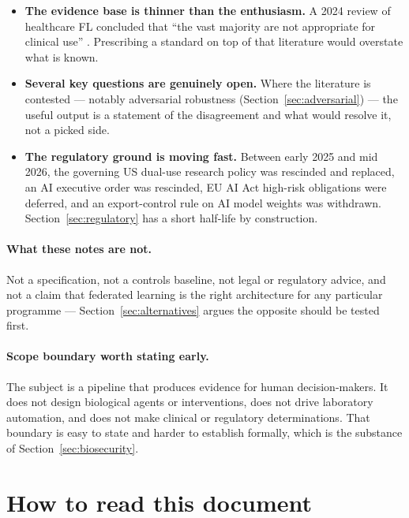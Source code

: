 \documentclass[11pt,a4paper]{article}
\begin{document}
\begin{itemize}
  \item \textbf{The evidence base is thinner than the enthusiasm.} A 2024
  review of healthcare FL concluded that ``the vast majority are not
  appropriate for clinical use'' \citep{li2024challenges}. Prescribing a
  standard on top of that literature would overstate what is known.

  \item \textbf{Several key questions are genuinely open.} Where the
  literature is contested --- notably adversarial robustness
  (Section~\ref{sec:adversarial}) --- the useful output is a statement of
  the disagreement and what would resolve it, not a picked side.

  \item \textbf{The regulatory ground is moving fast.} Between early 2025
  and mid 2026, the governing US dual-use research policy was rescinded and
  replaced, an AI executive order was rescinded, EU AI Act high-risk
  obligations were deferred, and an export-control rule on AI model weights
  was withdrawn. Section~\ref{sec:regulatory} has a short half-life by
  construction.
\end{itemize}

\paragraph{What these notes are not.} Not a specification, not a controls
baseline, not legal or regulatory advice, and not a claim that federated
learning is the right architecture for any particular programme ---
Section~\ref{sec:alternatives} argues the opposite should be tested first.

\paragraph{Scope boundary worth stating early.} The subject is a pipeline
that produces evidence for human decision-makers. It does not design
biological agents or interventions, does not drive laboratory automation,
and does not make clinical or regulatory determinations. That boundary is
easy to state and harder to establish formally, which is the substance of
Section~\ref{sec:biosecurity}.

\section{How to read this document}
\label{sec:howtoread}
\end{document}
